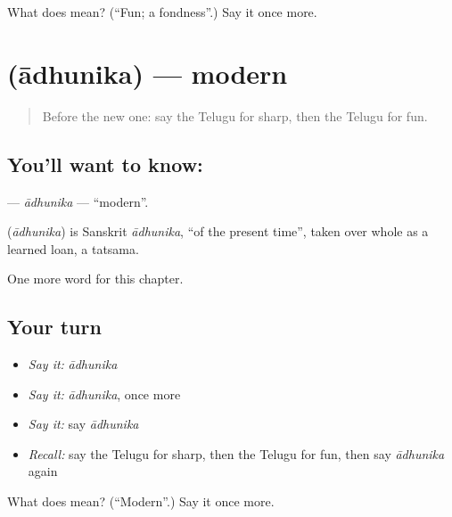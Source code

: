 \begin{tcolorbox}[breakable,colback=teal!4,colframe=teal!35!black,title={Before you move on}]
What does  mean? (\textquotedblleft{}Fun; a fondness\textquotedblright{}.) Say it once more.
\end{tcolorbox}
\section[\texorpdfstring{\te{ఆధునిక} (ādhunika)}{ఆధునిక (ādhunika)}]{ (ādhunika) — modern}

\label{lesson:TE-C222-adhunika}



\begin{quote}
Before the new one: say the Telugu for sharp, then the Telugu for fun.
\end{quote}

\subsection*{You'll want to know: }
\textbf{} — \emph{ādhunika} — \textquotedblleft{}modern\textquotedblright{}.

\begin{cousinweb}
\textbf{} (\emph{ādhunika}) is Sanskrit \emph{ādhunika}, \textquotedblleft{}of the present time\textquotedblright{}, taken over whole as a learned loan, a tatsama.
\end{cousinweb}

\begin{grammarlens}[title={What you've built}]
One more word for this chapter.
\end{grammarlens}

\subsection*{Your turn}
\begin{itemize}
\raggedright
  \item \emph{Say it:} \emph{ādhunika}
  \item \emph{Say it:} \emph{ādhunika}, once more
  \item \emph{Say it:} say \emph{ādhunika}
  \item \emph{Recall:} say the Telugu for sharp, then the Telugu for fun, then say \emph{ādhunika} again
\end{itemize}

\begin{tcolorbox}[breakable,colback=teal!4,colframe=teal!35!black,title={Before you move on}]
What does  mean? (\textquotedblleft{}Modern\textquotedblright{}.) Say it once more.
\end{tcolorbox}

